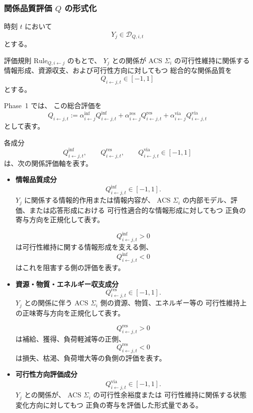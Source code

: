 \subsubsection{関係品質評価 $Q$ の形式化}

\begin{definition}[関係品質評価 $Q$]
\label{def:Q}
時刻 $t$ において
\[
  Y_j\in\mathcal D_{Q,i,t}
\]
とする。

評価規則 $\mathrm{Rule}_{Q,i\leftarrow j}$ のもとで、
$Y_j$ との関係が
ACS $\Sigma_i$ の可行性維持に関係する
情報形成、資源収支、および可行性方向に対してもつ
総合的な関係品質を
\[
  Q_{i\leftarrow j,t}
  \in[-1,1]
\]
とする。

Phase~1 では、
この総合評価を
\[
  Q_{i\leftarrow j,t}
  :=
  \alpha^{\mathrm{inf}}_{i\leftarrow j} Q^{\mathrm{inf}}_{i\leftarrow j,t}
  +
  \alpha^{\mathrm{res}}_{i\leftarrow j} Q^{\mathrm{res}}_{i\leftarrow j,t}
  +
  \alpha^{\mathrm{via}}_{i\leftarrow j} Q^{\mathrm{via}}_{i\leftarrow j,t}
\]
として表す。

各成分
\[
  Q^{\mathrm{inf}}_{i\leftarrow j,t},
  \qquad
  Q^{\mathrm{res}}_{i\leftarrow j,t},
  \qquad
  Q^{\mathrm{via}}_{i\leftarrow j,t}
  \in[-1,1]
\]
は、次の関係評価軸を表す。

\begin{itemize}
  \item
  \textbf{情報品質成分}
  \[
    Q^{\mathrm{inf}}_{i\leftarrow j,t}\in[-1,1].
  \]
  $Y_j$ に関係する情報的作用または情報内容が、
  ACS $\Sigma_i$ の内部モデル、評価、または応答形成における
  可行性適合的な情報形成に対してもつ
  正負の寄与方向を正規化して表す。

  \[
    Q^{\mathrm{inf}}_{i\leftarrow j,t}>0
  \]
  は可行性維持に関する情報形成を支える側、
  \[
    Q^{\mathrm{inf}}_{i\leftarrow j,t}<0
  \]
  はこれを阻害する側の評価を表す。

  \item
  \textbf{資源・物質・エネルギー収支成分}
  \[
    Q^{\mathrm{res}}_{i\leftarrow j,t}\in[-1,1].
  \]
  $Y_j$ との関係に伴う
  ACS $\Sigma_i$ 側の資源、物質、エネルギー等の
  可行性維持上の正味寄与方向を正規化して表す。

  \[
    Q^{\mathrm{res}}_{i\leftarrow j,t}>0
  \]
  は補給、獲得、負荷軽減等の正側、
  \[
    Q^{\mathrm{res}}_{i\leftarrow j,t}<0
  \]
  は損失、枯渇、負荷増大等の負側の評価を表す。

  \item
  \textbf{可行性方向評価成分}
  \[
    Q^{\mathrm{via}}_{i\leftarrow j,t}\in[-1,1].
  \]
  $Y_j$ との関係が、
  ACS $\Sigma_i$ の可行性余裕度または
  可行性維持に関係する状態変化方向に対してもつ
  正負の寄与を評価した形式量である。


\end{itemize}
\end{definition}
